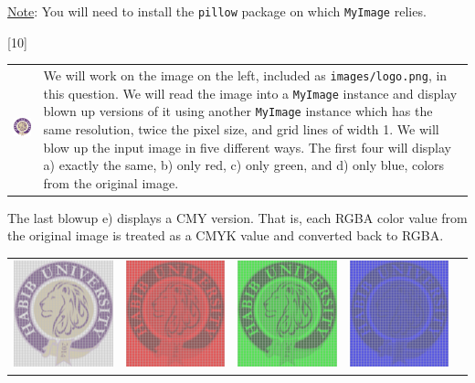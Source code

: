 \documentclass[addpoints]{exam}
\begin{document}
\begin{questions}
    \underline{Note}: You will need to install the \texttt{pillow} package on which \texttt{MyImage} relies.

[10]

  \begin{tabularx}{\textwidth}{cX}
    \includegraphics[align=t]{logo} & We will work on the image on the left, included as \texttt{images/logo.png}, in this question. We will read the image into a \texttt{MyImage} instance and display blown up versions of it using another \texttt{MyImage} instance which has the same resolution, twice the pixel size, and grid lines of width 1. We will blow up the input image in five different ways. The first four will display a) exactly the same, b) only red, c) only green, and d) only blue, colors from the original image.
  \end{tabularx}
  The last blowup e) displays a CMY version. That is, each RGBA color value from the original image is treated as a CMYK value and converted back to RGBA.
  \begin{center}
    \begin{tabular}{*{5}{c}}
      \includegraphics[width=.16\textwidth]{blow}
      & \includegraphics[width=.16\textwidth]{logo-r}
      & \includegraphics[width=.16\textwidth]{logo-g}
      & \includegraphics[width=.16\textwidth]{logo-b}

\end{tabular}
\end{center}
\end{questions}
\end{document}
